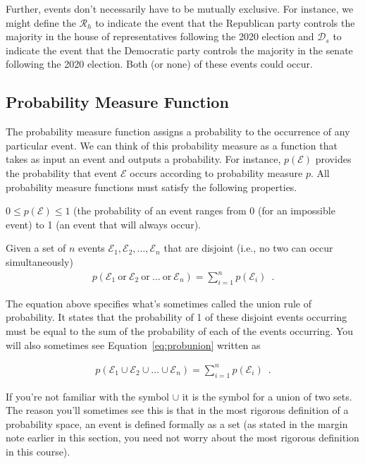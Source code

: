\documentclass[assignment01_Solutions]{subfiles}
\begin{document}
Further, events don't necessarily have to be mutually exclusive.  For instance, we might define the $\mathcal{R}_h$ to indicate the event that the Republican party controls the majority in the house of representatives following the 2020 election and $\mathcal{D}_s$ to indicate the event that the Democratic party controls the majority in the senate following the 2020 election.  Both (or none) of these events could occur.

\subsection{Probability Measure Function}
The probability measure function assigns a probability to the occurrence of any particular event.  We can think of this probability measure as a function that takes as input an event and outputs a probability.  For instance, $p(\mathcal{E})$ provides the probability that event $\mathcal{E}$ occurs according to probability measure $p$.  All probability measure functions must satisfy the following properties.

\bi
\item $0 \leq p(\mathcal{E}) \leq 1$ (the probability of an event ranges from 0 (for an impossible event) to 1 (an event that will always occur).
\item Given a set of $n$ events $\mathcal{E}_1, \mathcal{E}_2, \ldots, \mathcal{E}_n$ that are disjoint (i.e., no two can occur simultaneously)
\begin{align}
p(\mathcal{E}_1~\mbox{or}~\mathcal{E}_2~\mbox{or}~\ldots~\mbox{or}~\mathcal{E}_n) = \sum_{i=1}^n p(\mathcal{E}_i) \label{eq:probunion} \enspace .
\end{align}


The equation above specifies what's sometimes called the union rule of probability.  It states that the probability of 1 of these disjoint events occurring must be equal to the sum of the probability of each of the events occurring.  You will also sometimes see Equation~\ref{eq:probunion} written as

\begin{align}
p(\mathcal{E}_1 \cup \mathcal{E}_2 \cup \ldots \cup \mathcal{E}_n) = \sum_{i=1}^n p(\mathcal{E}_i) \enspace .
\end{align}

If you're not familiar with the symbol $\cup$ it is the symbol for a union of two sets.  The reason you'll sometimes see this is that in the most rigorous definition of a probability space, an event is defined formally as a set (as stated in the margin note earlier in this section, you need not worry about the most rigorous definition in this course).
\end{document}
